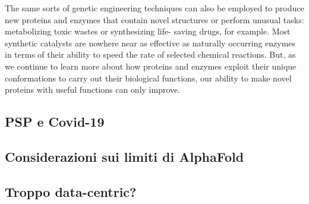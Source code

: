 The same sorts of genetic engineering techniques can also be employed
to produce new proteins and enzymes that contain novel structures or
perform unusual tasks: metabolizing toxic wastes or synthesizing life-
saving drugs, for example. Most synthetic catalysts are nowhere near as
effective as naturally occurring enzymes in terms of their ability to speed
the rate of selected chemical reactions. But, as we continue to learn more
about how proteins and enzymes exploit their unique conformations to
carry out their biological functions, our ability to make novel proteins
with useful functions can only improve. \supercite{alberts}

\subsection{PSP e Covid-19}

\subsection{Considerazioni sui limiti di AlphaFold}

\subsection{Troppo data-centric?}
